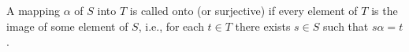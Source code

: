 A mapping $\alpha$ of $S$ into $T$ is called onto (or surjective) if every element of $T$ is the image of some element of $S$, i.e., for each $t \in T$ there exists $s \in S$ such that $s\alpha = t$.

